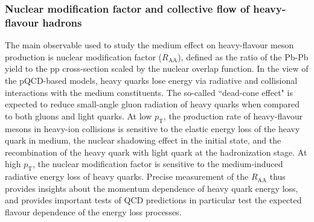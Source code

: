 

\subsubsection{Nuclear modification factor and collective flow of heavy-flavour hadrons}
\label{sec:HFRAAv2}
The main observable used to study the medium effect on heavy-flavour meson production is nuclear modification factor ($R_{\mathrm{AA}}$), defined as the ratio of the Pb-Pb yield to the pp cross-section scaled by the nuclear overlap function. In the view of the pQCD-based models, heavy quarks lose energy via radiative and collisional interactions with the medium constituents. The so-called ``dead-cone effect" is expected to reduce small-angle gluon radiation of heavy quarks when compared to both gluons and light quarks. At low $p_{\mathrm{T}}$, the production rate of heavy-flavour mesons in heavy-ion collisions is sensitive to the elastic energy loss of the heavy quark in medium, the nuclear shadowing effect in the initial state, and the recombination of the heavy quark with light quark at the hadronization stage. At high $p_{\mathrm{T}}$, the nuclear modification factor is sensitive to the medium-induced radiative energy loss of heavy quarks. Precise measurement of the $R_{\mathrm{AA}}$ thus provides insights about the momentum dependence of heavy quark energy loss, and provides important tests of QCD predictions in particular test the expected flavour dependence of the energy loss processes.

